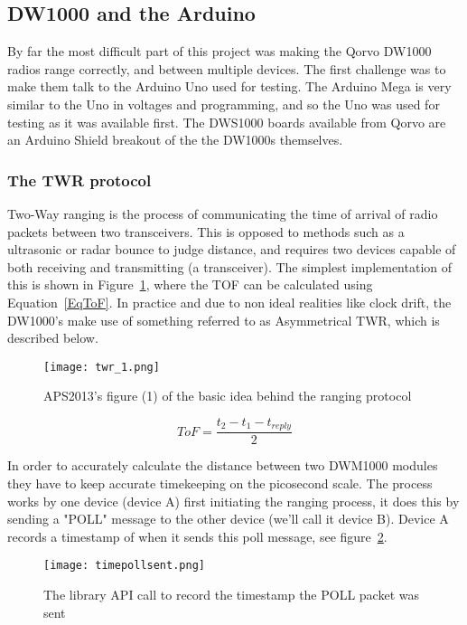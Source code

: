 \documentclass{article}
\begin{document}
\subsection{DW1000 and the Arduino}
By far the most difficult part of this project was making the Qorvo DW1000 radios range correctly, and between multiple devices. The first challenge was to make them talk to the Arduino Uno used for testing. The Arduino Mega is very similar to the Uno in voltages and programming, and so the Uno was used for testing as it was available first. The DWS1000 boards available from Qorvo are an Arduino Shield breakout of the the DW1000s themselves.

\subsubsection{The TWR protocol}
Two-Way ranging is the process of communicating the time of arrival of radio packets between two transceivers. This is opposed to methods such as a ultrasonic or radar bounce to judge distance, and requires two devices capable of both receiving and transmitting (a transceiver). The simplest implementation of this is shown in Figure~\ref{fig:aps2013_twr1}, where the TOF can be calculated using Equation~\ref{EqToF}. In practice and due to non ideal realities like clock drift, the DW1000's make use of something referred to as Asymmetrical TWR, which is described below. 

\begin{figure}[h]
    \centering
    \texttt{[image: twr\_1.png]}
    \caption{APS2013's figure (1) of the basic idea behind the ranging protocol}
    \label{fig:aps2013_twr1}
\end{figure}

\begin{equation}\label{EqToF}
ToF = \frac{t_2 - t_1 - t_{reply}}{2}
\end{equation}

In order to accurately calculate the distance between two DWM1000 modules they have to keep accurate timekeeping on the picosecond scale. The process works by one device (device A) first initiating the ranging process, it does this by sending a "POLL" message to the other device (we'll call it device B). Device A records a timestamp of when it sends this poll message, see figure~\ref{fig:poll_ack}. 

\begin{figure}[h]
    \centering
    \texttt{[image: timepollsent.png]}
    \caption{The library API call to record the timestamp the POLL packet was sent}
    \label{fig:poll_ack}
\end{figure}
\end{document}
